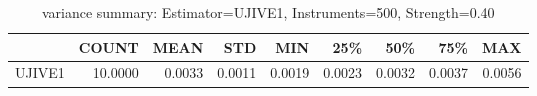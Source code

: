 \begin{table}[ht]
\centering
\caption{variance summary: Estimator=UJIVE1, Instruments=500, Strength=0.40}
\begin{tabular}{lrrrrrrrr}
\toprule
 & COUNT & MEAN & STD & MIN & 25\% & 50\% & 75\% & MAX \\
\midrule
UJIVE1 & 10.0000 & 0.0033 & 0.0011 & 0.0019 & 0.0023 & 0.0032 & 0.0037 & 0.0056 \\
\bottomrule
\end{tabular}
\end{table}
